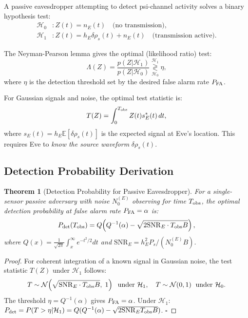 \documentclass[aps,prd,twocolumn,superscriptaddress,nofootinbib]{revtex4-2}
\newcommand{\SNR}{\mathrm{SNR}}
\newtheorem{theorem}{Theorem}
\begin{document}
A passive eavesdropper attempting to detect psi-channel activity solves a
binary hypothesis test:
\begin{align}
\mathcal{H}_0 &: Z(t) = n_E(t) \quad \text{(no transmission)}, \\
\mathcal{H}_1 &: Z(t) = h_E \delta\rho_s(t) + n_E(t) \quad \text{(transmission active)}.
\end{align}

The Neyman-Pearson lemma gives the optimal (likelihood ratio) test:
\begin{equation}
\Lambda(Z) = \frac{p(Z|\mathcal{H}_1)}{p(Z|\mathcal{H}_0)} \underset{\mathcal{H}_0}{\overset{\mathcal{H}_1}{\gtrless}} \eta,
\label{eq:NP-test}
\end{equation}
where $\eta$ is the detection threshold set by the desired false alarm rate $P_{\rm FA}$.

For Gaussian signals and noise, the optimal test statistic is:
\begin{equation}
T(Z) = \int_0^{T_{\rm obs}} Z(t) s_E^*(t)\, dt,
\label{eq:matched-filter}
\end{equation}
where $s_E(t) = h_E \mathbb{E}[\delta\rho_s(t)]$ is the expected signal at Eve's location.
This requires Eve to \emph{know the source waveform} $\delta\rho_s(t)$.

\subsection{Detection Probability Derivation}

\begin{theorem}[Detection Probability for Passive Eavesdropper]
\label{thm:det-prob}
For a single-sensor passive adversary with noise $N_0^{(E)}$ observing
for time $T_{\rm obs}$, the optimal detection probability at false alarm
rate $P_{\rm FA} = \alpha$ is:
\begin{equation}
P_{\rm det}(T_{\rm obs}) = Q\!\left(Q^{-1}(\alpha) - \sqrt{2\SNR_E \cdot T_{\rm obs} B}\right),
\label{eq:Pdet}
\end{equation}
where $Q(x) = \frac{1}{\sqrt{2\pi}}\int_x^\infty e^{-t^2/2}dt$ and
$\SNR_E = h_E^2 P_s / (N_0^{(E)} B)$.
\end{theorem}

\begin{proof}
For coherent integration of a known signal in Gaussian noise, the
test statistic $T(Z)$ under $\mathcal{H}_1$ follows:
\begin{equation}
T \sim \mathcal{N}\!\left(\sqrt{\SNR_E \cdot T_{\rm obs} B},\; 1\right) \;\text{ under }\mathcal{H}_1,
\quad T \sim \mathcal{N}(0,1) \;\text{ under }\mathcal{H}_0.
\end{equation}
The threshold $\eta = Q^{-1}(\alpha)$ gives $P_{\rm FA} = \alpha$.
Under $\mathcal{H}_1$: $P_{\rm det} = P(T > \eta|\mathcal{H}_1)
= Q(Q^{-1}(\alpha) - \sqrt{2\SNR_E T_{\rm obs} B})$. $\square$
\end{proof}
\end{document}
